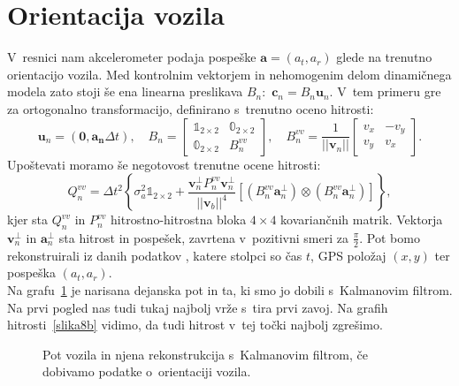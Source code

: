 \documentclass[a4paper,pdftex,10pt]{article}
\renewcommand{\vec}[1]{\boldsymbol{\mathbf{#1}}}
\numberwithin{figure}{section} %
\begin{document}
\section{Orientacija vozila}
V~resnici nam akcelerometer podaja pospeške $\vec{a} = (a_t, a_r)$ glede na trenutno 
orientacijo vozila. Med kontrolnim vektorjem in nehomogenim delom dinamičnega modela
zato stoji še ena linearna preslikava $B_n:$ $\vec{c}_n = B_n \vec{u}_n.$ V~tem primeru
gre za ortogonalno transformacijo, definirano s~trenutno oceno hitrosti:
\begin{equation}
    \vec{u}_n = (\vec{0}, \vec{a_n} \Delta t), \quad
    B_n = 
    \begin{bmatrix}
	\mathbb{1}_{2\times 2} & \mathbb{0}_{2\times 2} \\
	\mathbb{0}_{2\times 2} & B_n^{vv}
    \end{bmatrix}, \quad
    B_n^{vv} = \frac{1}{|| \vec{v}_n ||}
    \begin{bmatrix}
	v_x & -v_y \\
	v_y & v_x
    \end{bmatrix}.
\end{equation}
Upoštevati moramo še negotovost trenutne ocene hitrosti:
\begin{equation}
    Q_n^{vv} = \Delta t^2 \left\{ \sigma_a^2 \mathbb{1}_{2\times 2} + 
	\frac{\vec{v}_n^{\perp} P_n^{vv} \vec{v}_n^{\perp}}{ ||\vec{v}_b||^4}
	\left[ (B_n^{vv} \vec{a}_n^{\perp}) \otimes (B_n^{vv} \vec{a}_n^{\perp}) 
	\right] \right\},
\end{equation}
kjer sta $Q_n^{vv}$ in $P_n^{vv}$ hitrostno-hitrostna bloka $4\times4$ kovariančnih matrik.
Vektorja $\vec{v}_n^{\perp}$ in $\vec{a}_n^{\perp}$ sta hitrost in pospešek, zavrtena 
v~pozitivni smeri za $\frac{\pi}{2}$. Pot bomo rekonstruirali iz danih podatkov 
, katere stolpci so čas $t$, GPS položaj $(x,y)$ ter pospeška
$(a_t,a_r)$.\\
Na grafu~\ref{slika8a} je narisana dejanska pot in ta, ki smo jo dobili s~Kalmanovim 
filtrom. Na prvi pogled nas tudi tukaj najbolj vrže s~tira prvi zavoj. Na grafih 
hitrosti~\ref{slika8b} vidimo, da tudi hitrost v~tej točki najbolj zgrešimo.
\begin{figure}[H]
    \centering
    \resizebox{.49\linewidth}{!}{}
    \resizebox{.49\linewidth}{!}{}
    \caption{Pot vozila in njena rekonstrukcija s~Kalmanovim filtrom, če dobivamo podatke
    o~orientaciji vozila.}
    \label{slika8a}
\end{figure}
\end{document}

